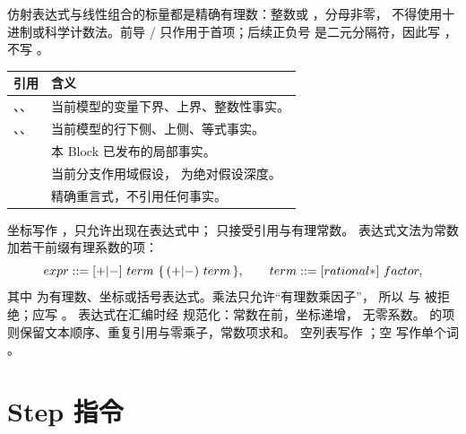 仿射表达式与线性组合的标量都是精确有理数：整数或 ，分母非零，
不得使用十进制或科学计数法。前导 \code{+}/\code{-} 只作用于首项；后续正负号
是二元分隔符，因此写 ，不写 。

\begin{center}
\begin{tabularx}{\textwidth}{lY}
\toprule
引用 & 含义 \\
\midrule
{}、、 & 当前模型的变量下界、上界、整数性事实。\\
、、 & 当前模型的行下侧、上侧、等式事实。\\
 & 本 Block 已发布的局部事实。\\
 & 当前分支作用域假设， 为绝对假设深度。\\
 & 精确重言式，不引用任何事实。\\
\bottomrule
\end{tabularx}
\end{center}

坐标写作 ，只允许出现在表达式中； 只接受引用与有理常数。
表达式文法为常数加若干前缀有理系数的项：
\[
 \code{expr} ::= [\code{+}|\code{-}]\ \code{term}\
 \{\,(\code{+}|\code{-})\ \code{term}\,\},\qquad
 \code{term} ::= [\code{rational} \code{*}]\ ,
\]
其中 \code{factor} 为有理数、坐标或括号表达式。乘法只允许“有理数乘因子”，
所以  与  被拒绝；应写 。
表达式在汇编时经  规范化：常数在前，坐标递增，
无零系数。 的项则保留文本顺序、重复引用与零乘子，常数项求和。
空列表写作 \code{()}；空  写作单个词 。

\section{Step 指令}
\label{sec:rpa-steps}

